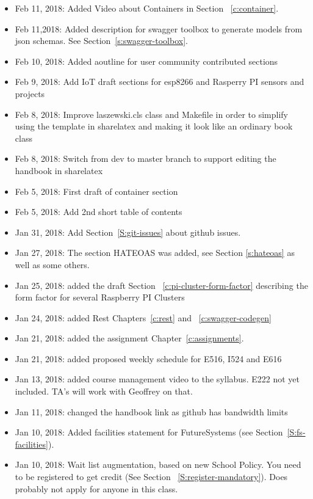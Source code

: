 \begin{itemize}
\item Feb 11, 2018: Added Video about Containers in Section
 ~\ref{c:container}.


\item Feb 11,2018: Added description for swagger toolbox to generate
  models from json schemas. See Section~\ref{s:swagger-toolbox}.
\item Feb 10, 2018: Added aoutline for user community contributed
  sections
\item Feb 9, 2018: Add IoT draft sections for esp8266 and Rasperry PI
  sensors and projects
\item Feb 8, 2018: Improve laszewski.cls class and Makefile in order
  to simplify using the template in sharelatex and making it look like
  an ordinary book class
\item Feb 8, 2018: Switch from dev to master branch to support editing
  the handbook in sharelatex
\item Feb 5, 2018: First draft of container section
\item Feb 5, 2018: Add 2nd short table of contents
\item Jan 31, 2018: Add Section~\ref{S:git-issues} about github issues.
\item Jan 27, 2018: The section HATEOAS was added, see
  Section \ref{s:hateoas} as well as some others.
\item Jan 25, 2018: added the draft Section
 ~\ref{c:pi-cluster-form-factor} describing the form factor for
  several Raspberry PI Clusters

\item Jan 24, 2018: added Rest Chapters~\ref{c:rest} and
 ~\ref{c:swagger-codegen}
 
\item Jan 21, 2018: added the assignment Chapter~\ref{c:assignments}.

\item Jan 21, 2018: added proposed weekly schedule for E516, I524 and
  E616

\item Jan 13, 2018: added course management video to the
  syllabus. E222 not yet included. TA's will work with Geoffrey on
  that.

\item Jan 11, 2018: changed the handbook link as github has bandwidth
  limits

\item Jan 10, 2018: Added facilities statement for FutureSystems (see
  Section~\ref{S:fs-facilities}).

\item Jan 10, 2018: Wait list augmentation, based on new School
  Policy. You need to be registered to get credit (See Section
 ~\ref{S:register-mandatory}). Does probably not apply for anyone in
  this class.

\end{itemize}
